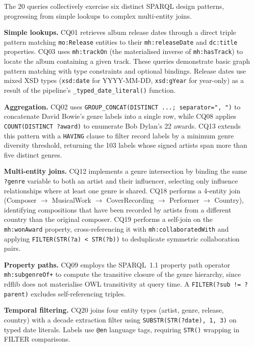 \documentclass[11pt,a4paper]{article}
\begin{document}
The 20 queries collectively exercise six distinct SPARQL design patterns, progressing from simple lookups to complex multi-entity joins.

\textbf{Simple lookups.} CQ01 retrieves album release dates through a direct triple pattern matching \texttt{mo:Release} entities to their \texttt{mh:releaseDate} and \texttt{dc:title} properties. CQ03 uses \texttt{mh:trackOn} (the materialised inverse of \texttt{mh:hasTrack}) to locate the album containing a given track. These queries demonstrate basic graph pattern matching with type constraints and optional bindings. Release dates use mixed XSD types (\texttt{xsd:date} for YYYY-MM-DD, \texttt{xsd:gYear} for year-only) as a result of the pipeline's \texttt{\_typed\_date\_literal()} function.

\textbf{Aggregation.} CQ02 uses \texttt{GROUP\_CONCAT(DISTINCT ...; separator=", ")} to concatenate David Bowie's genre labels into a single row, while CQ08 applies \texttt{COUNT(DISTINCT ?award)} to enumerate Bob Dylan's 22 awards. CQ13 extends this pattern with a \texttt{HAVING} clause to filter record labels by a minimum genre diversity threshold, returning the 103 labels whose signed artists span more than five distinct genres.

\textbf{Multi-entity joins.} CQ12 implements a genre intersection by binding the same \texttt{?genre} variable to both an artist and their influencer, selecting only influence relationships where at least one genre is shared. CQ18 performs a 4-entity join (Composer $\rightarrow$ MusicalWork $\rightarrow$ CoverRecording $\rightarrow$ Performer $\rightarrow$ Country), identifying compositions that have been recorded by artists from a different country than the original composer. CQ19 performs a self-join on the \texttt{mh:wonAward} property, cross-referencing it with \texttt{mh:collaboratedWith} and applying \texttt{FILTER(STR(?a) < STR(?b))} to deduplicate symmetric collaboration pairs.

\textbf{Property paths.} CQ09 employs the SPARQL~1.1 property path operator \texttt{mh:subgenreOf+} to compute the transitive closure of the genre hierarchy, since rdflib does not materialise OWL transitivity at query time. A \texttt{FILTER(?sub != ?parent)} excludes self-referencing triples.

\textbf{Temporal filtering.} CQ20 joins four entity types (artist, genre, release, country) with a decade extraction filter using \texttt{SUBSTR(STR(?date), 1, 3)} on typed date literals. Labels use \texttt{@en} language tags, requiring \texttt{STR()} wrapping in FILTER comparisons.
\end{document}
